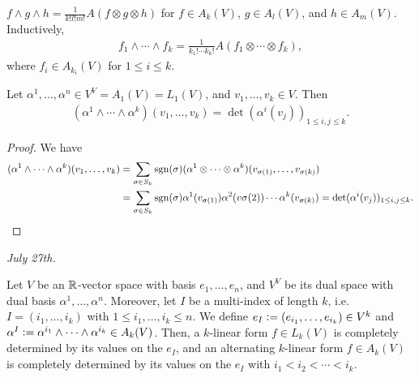 \begin{corollary}
    $f \wedge g \wedge h = \frac{1}{k!l!m!} A(f \otimes g \otimes h)$ for $f \in A_{k}(V)$, $g \in A_{l}(V)$, and $h \in A_{m}(V)$. Inductively,
    \begin{align}
        f_{1} \wedge \cdots \wedge f_{k} = \frac{1}{k_{1}!\cdots k_{k}!} A(f_{1} \otimes \cdots \otimes f_{k}),
    \end{align}
    where $f_{i} \in A_{k_{i}}(V)$ for $1 \leq i \leq k$.
\end{corollary}

\begin{proposition}
    Let $\alpha^{1},\ldots,\alpha^{n} \in V^{V} = A_{1}(V) = L_{1}(V)$, and $v_{1},\ldots,v_{k} \in V$. Then
    \begin{align}
        (\alpha^{1} \wedge \cdots \wedge \alpha^{k})(v_{1},\ldots,v_{k}) = \det(\alpha^{i}(v_{j}))_{1 \leq i,j \leq k}.
    \end{align}
\end{proposition}

\begin{proof}
    We have
    \begin{align}
        (\alpha^{1} \wedge \cdots \wedge \alpha^{k})(v_{1},\ldots,v_{k}) &= \sum_{\sigma \in S_{k}} \operatorname{sgn}(\sigma)(\alpha^{1} \otimes \cdots \otimes \alpha^{k})(v_{\sigma(1)},\ldots,v_{\sigma(k)}) \notag \\
        &= \sum_{\sigma \in S_{k}} \operatorname{sgn}(\sigma) \alpha^{1}(v_{\sigma(1)})\alpha^{2}(v{\sigma(2)}) \cdots \alpha^{k}(v_{\sigma(k)}) = \det(\alpha^{i}(v_{j}))_{1 \leq i,j \leq k}.
    \end{align}
\end{proof}

\noindent \textit{July 27th.}

Let $V$ be an $\mathbb{R}$-vector space with basis $e_{1},\ldots,e_{n}$, and $V^{V}$ be its dual space with dual basis $\alpha^{1},\ldots,\alpha^{n}$. Moreover, let $I$ be a multi-index of length $k$, i.e. $I = (i_{1},\ldots,i_{k})$ with $1 \leq i_{1},\ldots,i_{k} \leq n$. We define $e_{I} \vcentcolon= (e_{i_{1}},\ldots,e_{i_{k}}) \in V^{k}$ and $\alpha^{I} \vcentcolon= \alpha^{i_{1}} \wedge \cdots \wedge \alpha^{i_{k}} \in A_{k}(V)$. Then, a $k$-linear form $f \in L_{k}(V)$ is completely determined by its values on the $e_{I}$, and an alternating $k$-linear form $f \in A_{k}(V)$ is completely determined by its values on the $e_{I}$ with $i_{1} < i_{2} < \cdots < i_{k}$.

